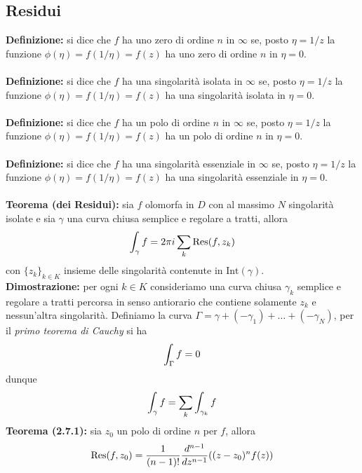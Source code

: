 \documentclass{article}
\begin{document}
\newpage
\subsection{Residui}
\textbf{Definizione:} si dice che $f$ ha uno zero di ordine $n$ in $\infty$ se, posto $\eta = 1/z$ la funzione $\phi(\eta) = f(1/\eta) = f(z)$ ha uno zero di ordine $n$ in $\eta = 0$. \\ \\
\textbf{Definizione:} si dice che $f$ ha una singolarità isolata in $\infty$ se, posto $\eta = 1/z$ la funzione $\phi(\eta) = f(1/\eta) = f(z)$ ha una singolarità isolata in $\eta = 0$. \\ \\
\textbf{Definizione:} si dice che $f$ ha un polo di ordine $n$ in $\infty$ se, posto $\eta = 1/z$ la funzione $\phi(\eta) = f(1/\eta) = f(z)$ ha un polo di ordine $n$ in $\eta = 0$. \\ \\
\textbf{Definizione:} si dice che $f$ ha una singolarità essenziale in $\infty$ se, posto $\eta = 1/z$ la funzione $\phi(\eta) = f(1/\eta) = f(z)$ ha una singolarità essenziale in $\eta = 0$. \\ \\
\textbf{Teorema (dei Residui):} sia $f$ olomorfa in $D$ con al massimo $N$ singolarità isolate e sia $\gamma$ una curva chiusa semplice e regolare a tratti, allora
\begin{gather}
    \int_{\gamma}f = 2\pi i \sum_k \mathrm{Res}(f, z_k) \notag
\end{gather}
con $\{z_k\}_{k \in K}$ insieme delle singolarità contenute in $\mathrm{Int}(\gamma)$. \\

\textbf{Dimostrazione:} per ogni $k \in K$ consideriamo una curva chiusa $\gamma_k$ semplice e regolare a tratti percorsa in senso antiorario che contiene solamente $z_k$ e nessun'altra singolarità. Definiamo la curva $\Gamma = \gamma + (-\gamma_1) + \dots + (-\gamma_N)$, per il \textit{primo teorema di Cauchy} si ha
\begin{gather}
    \int_\Gamma f = 0 \notag
\end{gather}
dunque
\begin{gather}
    \int_\gamma f = \sum_k \int_{\gamma_k}f \notag
\end{gather}
\textbf{Teorema (2.7.1):} sia $z_0$ un polo di ordine $n$ per $f$, allora
\begin{gather}
    \mathrm{Res}(f, z_0) = \frac{1}{(n - 1)!}\frac{d^{n-1}}{dz^{n-1}}((z - z_0)^nf(z)) \notag
\end{gather}
\end{document}

